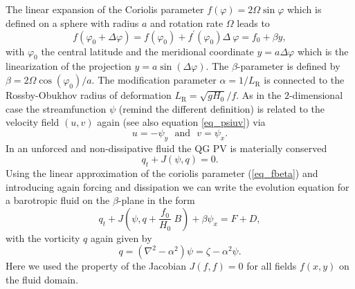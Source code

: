The linear expansion of the Coriolis parameter 
$f(\varphi) = 2 \Omega \sin \varphi$ which is defined on a sphere 
with radius $a$ and rotation rate $\Omega$ leads to
\begin{equation} \label{eq_fbeta}
  f(\varphi_{0} +  \Delta \varphi)
   =
  f(\varphi_{0}) + f^{\prime}(\varphi_{0}) \Delta \ \varphi   
   = 
  f_{0} + \beta  y,  
\end{equation}
with $\varphi_{0}$ the central latitude and the meridional 
coordinate $y = a \Delta \varphi$ which is the linearization of 
the projection $y = a \sin(\Delta \varphi)$. The $\beta$-parameter 
is defined by $\beta = 2 \Omega \cos(\varphi_{0})/a$. The modification 
parameter $\alpha = 1/L_{\mathrm{R}}$ is connected to the Rossby-Obukhov 
radius of deformation $L_{\mathrm{R}} = \sqrt{g H_{0}}/f$. 
As in the $2$-dimensional case the streamfunction $\psi$ 
(remind the different definition) is related to the velocity field 
$(u,v)$ again (see also equation \ref{eq_psiuv})  via
\begin{equation} \label{eq_upsibaro}
  u = -\psi_{y} \ \ \ \mbox{and} \ \ \ v = \psi_{x}.
\end{equation}
In an unforced and non-dissipative fluid the QG PV is materially conserved
\begin{equation} 
  q_{t} + J(\psi,q) = 0. 
\end{equation}  
Using the linear approximation of the coriolis parameter (\ref{eq_fbeta})
and introducing again forcing and dissipation we can write the evolution
equation for a barotropic fluid on the $\beta$-plane in the form
\begin{equation} \label{eq_quasi2Dbaro}
  q_{t} + J(\psi,q + \frac{f_{0}}{H_{0}} \ B) + \beta \psi_{x} = F + D,
\end{equation}
with the vorticity $q$ again given by
\begin{equation} \label{eq_vortquasi2Dbaro}
  q = \left(\nabla^2 -\alpha^{2} \right) \psi 
    = \zeta - \alpha^{2} \psi.
\end{equation}
Here we used the property of the Jacobian $J(f,f) = 0$ for all fields
$f(x,y)$ on the fluid domain.

